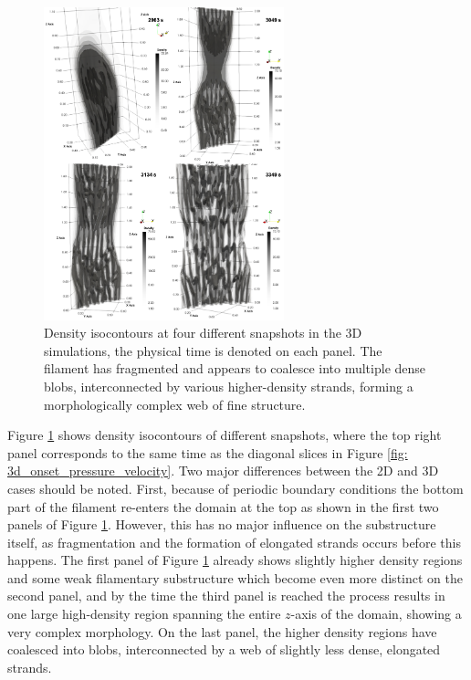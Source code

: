 \begin{figure}[t]
  \centering
  \includegraphics[width=0.62\textwidth]{3d_density_evolution.png}
  \caption{
    Density isocontours at four different snapshots in the 3D simulations, the physical time is denoted on each panel. The filament has fragmented and appears to coalesce into multiple dense blobs, interconnected by various higher-density strands, forming a morphologically complex web of fine structure.
  }
  \label{fig: 3d_density_evolution}
\end{figure}

Figure \ref{fig: 3d_density_evolution} shows density isocontours of different snapshots, where the top right panel corresponds to the same time as the diagonal slices in Figure \ref{fig: 3d_onset_pressure_velocity}. Two major differences between the 2D and 3D cases should be noted. First, because of periodic boundary conditions the bottom part of the filament re-enters the domain at the top as shown in the first two panels of Figure \ref{fig: 3d_density_evolution}. However, this has no major influence on the substructure itself, as fragmentation and the formation of elongated strands occurs before this happens. The first panel of Figure \ref{fig: 3d_density_evolution} already shows slightly higher density regions and some weak filamentary substructure which become even more distinct on the second panel, and by the time the third panel is reached the process results in one large high-density region spanning the entire $z$-axis of the domain, showing a very complex morphology. On the last panel, the higher density regions have coalesced into blobs, interconnected by a web of slightly less dense, elongated strands.

